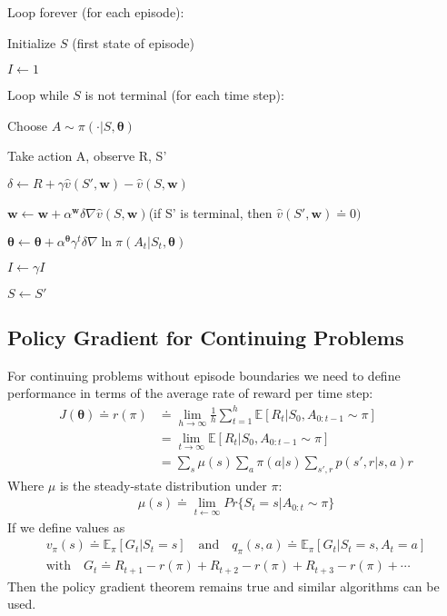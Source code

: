 {\begin{tcolorbox}[colback=black!7!white,colframe=black!75!white,title=\textbf{One-step Actor-Critic (episodic), for $\pi_\theta\approx\pi_* $}]
    Loop forever (for each episode):

        \qquad Initialize $S$ (first state of episode)

        \qquad $I\leftarrow 1$

        \qquad Loop while $S$ is not terminal (for each time step):

        \qquad\qquad Choose $A\sim\pi(\cdot|S, \bm{\theta})$
        
        \qquad\qquad Take action A, observe R, S'

        \qquad\qquad $\delta\leftarrow R+\gamma\hat{v}(S', \bm{w})-\hat{v}(S, \bm{w})$

        \qquad\qquad $\bm{w}\leftarrow\bm{w}+\alpha^{\bm{w}}\delta\nabla\hat{v}(S, \bm{w})$\qquad\qquad (if S' is terminal, then $\hat{v}(S', \bm{w})\doteq 0)$

        \qquad\qquad $\bm{\theta}\leftarrow \bm{\theta}+\alpha^{\bm{\theta}}\gamma^t\delta\nabla\ln\pi(A_t|S_t, \bm{\theta})$

        \qquad\qquad $I\leftarrow\gamma I$

        \qquad\qquad $S\leftarrow S'$
\end{tcolorbox}

\subsection{Policy Gradient for Continuing Problems}
For continuing problems without episode boundaries we need
to define performance in terms of the average rate of reward per time step:
\begin{align*}
    J(\bm{\theta})\doteq r(\pi)&\doteq \lim_{h\rightarrow\infty}\frac{1}{h}\sum_{t=1}^{h}\mathbb{E}[R_t|S_0,A_{0:t-1}\sim\pi]\\
    &=\lim_{t\rightarrow\infty}\mathbb{E}[R_t|S_0,A_{0:t-1}\sim\pi]\\
    &=\sum_{s}\mu(s)\sum_{a}\pi(a|s)\sum_{s',r}p(s',r|s,a)r
\end{align*}
Where $\mu$ is the steady-state distribution under $\pi$:
\begin{align*}
    \mu(s)\doteq\lim_{t\leftarrow\infty}Pr\{S_t=s|A_{0:t}\sim\pi\}
\end{align*}
If we define values as
\begin{align*}
    v_\pi(s)\doteq\mathbb{E}_\pi[G_t|S_t=s]\quad\text{and}\quad q_\pi(s,a)\doteq\mathbb{E}_\pi[G_t|S_t=s, A_t=a]\\
    \text{with}\quad G_t\doteq R_{t+1}-r(\pi)+R_{t+2}-r(\pi)+R_{t+3}-r(\pi)+\cdots
\end{align*}
Then the policy gradient theorem remains true and similar algorithms can be used.

}
